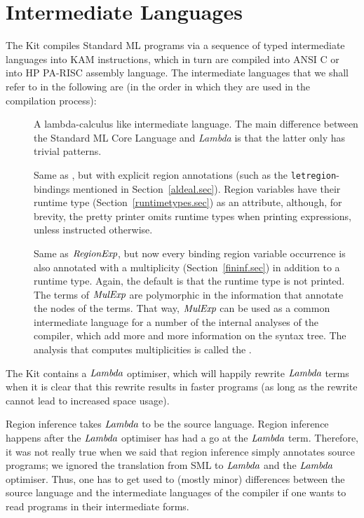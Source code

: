 \documentclass[12pt]{book}
\begin{document}
\section{Intermediate Languages}
The Kit compiles Standard ML programs via a sequence of typed intermediate 
languages into  KAM instructions, which in turn are compiled into ANSI C or into HP 
PA-RISC assembly language.
The intermediate languages that
we shall refer to in the following are (in the order in which they are used in the
compilation process):
\begin{description}
\item[\Lam] A lambda-calculus like intermediate language. The main difference between
  the Standard ML Core Language and {\it Lambda} is that the latter only has trivial patterns.
\item[\RegExp] Same as \Lam, 
but with explicit region annotations (such as the {\tt letregion}-bindings
mentioned in Section~\ref{aldeal.sec}). Region variables have their runtime type (Section~\ref{runtimetypes.sec})
as an attribute, although, for brevity, the pretty printer omits runtime types when printing expressions, 
unless instructed otherwise.
\item[\MulExp] Same as $\hbox{\it RegionExp}$, but now every binding region variable occurrence
is also annotated with a multiplicity (Section~\ref{fininf.sec}) in addition to a runtime type.
Again, the default is that the runtime type is not printed. The terms of $\hbox{\it MulExp}$ are polymorphic 
in the information that annotate the nodes of the terms. That way, $\hbox{\it MulExp}$ can be used
as a common intermediate language for a number of the internal analyses of the compiler, which
add more and more information on the syntax tree.
The analysis that computes multiplicities is called the .
\end{description}

The Kit contains a $\hbox{\it Lambda}$ optimiser,
which will happily rewrite $\hbox{\it Lambda}$ terms when it is clear that this rewrite results in faster programs
(as long as the rewrite cannot lead to increased space usage).

Region inference takes $\hbox{\it Lambda}$ to be the source language. Region inference happens after
the $\hbox{\it Lambda}$ optimiser has had a go at the $\hbox{\it Lambda}$ term. 
Therefore, it was not really true when we said that region inference simply annotates source
programs;  we ignored the translation from SML to $\hbox{\it Lambda}$ and
the $\hbox{\it Lambda}$ optimiser. Thus, one has to get used to (mostly minor) differences between
the source language and the intermediate languages of the compiler if one wants to read
programs in their intermediate forms.
\end{document}
